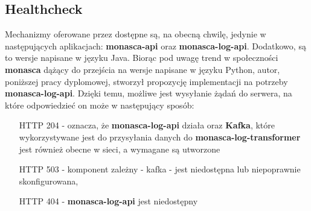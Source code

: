 
\subsection{Healthcheck}
\label{chapter:application_own:plans:healthcheck}

Mechanizmy oferowane przez  dostępne są, na obecną chwilę, jedynie
w następujących aplikacjach: \textbf{monasca-api} oraz \textbf{monasca-log-api}. Dodatkowo, są to wersje napisane w języku
Java. Biorąc pod uwagę trend w społeczności \textbf{monasca} dążący do przejścia na wersje napisane w języku Python,
autor, poniższej pracy dyplomowej, stworzył propozycję implementacji na potrzeby \textbf{monasca-log-api}. Dzięki
temu, możliwe jest wysyłanie żądań do serwera, na które odpowiedzieć on może w następujący sposób:
\begin{itemize}
    \item[HTTP 204] - oznacza, że \textbf{monasca-log-api} działa oraz \textbf{Kafka}, które wykorzystywane jest
    do przysyłania danych do \textbf{monasca-log-transformer} jest również obecne w sieci, a wymagane  są
    utworzone
    \item[HTTP 503] - komponent zależny - kafka - jest niedostępna lub niepoprawnie skonfigurowana,
    \item[HTTP 404] - \textbf{monasca-log-api} jest niedostępny
\end{itemize}

